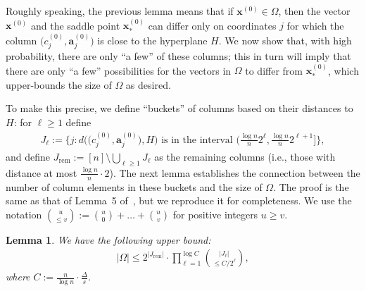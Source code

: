 \documentclass{article}
\newcommand{\av}[0]{\mathbf{a}}
\newcommand{\xv}[0]{\mathbf{x}}
\newtheorem{lemma}{Lemma}[section]
\begin{document}
Roughly speaking, the previous lemma means that if $\xv^{(0)} \in \Omega$, then the vector $\xv^{(0)}$ and the saddle point $\xv^{(0)}_*$ can differ only on coordinates $j$ for which the column $\big(c^{(0)}_j, \av^{(0)}_j\big)$ is close to the hyperplane $H$. We now show that, with high probability, there are only ``a few'' of these columns; this in turn will imply that there are only ``a few'' possibilities for the vectors in $\Omega$ to differ from $\xv^{(0)}_*$, which upper-bounds the size of $\Omega$ as desired.

To make this precise, we define ``buckets'' of columns based on their distances to $H$: for $\ell \ge 1$ define
\begin{align*}
    J_\ell := \bigg\{j : d\Big(\big(c^{(0)}_j, \av^{(0)}_j\big),H\Big) \textrm{ is in the interval } \Big(\tfrac{\log n}{n} 2^\ell, \tfrac{\log n}{n} 2^{\ell+1} \Big] \bigg\},
\end{align*}
and define $J_{\mathrm{rem}} := [n] \setminus \bigcup_{\ell \ge 1} J_\ell$ as the remaining columns (i.e., those with distance at most $\frac{\log n}{n} \cdot 2$). The next lemma establishes the connection between the number of column elements in these buckets and the size of $\Omega$. The proof is the same as that of Lemma~5 of~\cite{dey2021branch}, but we reproduce it for completeness. We use the notation $\binom{u}{\le v} := \binom{u}{0} + \ldots + \binom{u}{v}$ for positive integers $u \ge v$.

\begin{lemma} \label{lemma:count}
    We have the following upper bound:
    \begin{align*}
        |\Omega| \le 2^{|J_{\mathrm{rem}}|} \cdot \prod_{\ell=1}^{\log C}
        \binom{|J_{\ell}|}{\le C/2^\ell},
    \end{align*}
    where $C := \frac{n}{\log n} \cdot \frac{\Delta}{s}$.
\end{lemma}
\end{document}
